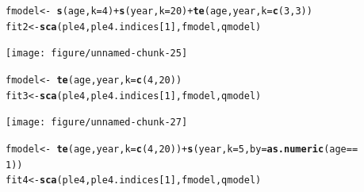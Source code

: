 \documentclass[a4paper,english,10pt]{article}\usepackage[]{graphicx}\usepackage[]{color}
\makeatletter
\newcommand{\hlnum}[1]{\textcolor[rgb]{0.686,0.059,0.569}{#1}}%
\newcommand{\hlopt}[1]{\textcolor[rgb]{0,0,0}{#1}}%
\newcommand{\hlstd}[1]{\textcolor[rgb]{0.345,0.345,0.345}{#1}}%
\newcommand{\hlkwb}[1]{\textcolor[rgb]{0.69,0.353,0.396}{#1}}%
\newcommand{\hlkwc}[1]{\textcolor[rgb]{0.333,0.667,0.333}{#1}}%
\newcommand{\hlkwd}[1]{\textcolor[rgb]{0.737,0.353,0.396}{\textbf{#1}}}%
\newenvironment{kframe}{%
 \def\at@end@of@kframe{}%
 \ifinner\ifhmode%
  \def\at@end@of@kframe{\end{minipage}}%
  \begin{minipage}{\columnwidth}%
 \fi\fi%
 \def\FrameCommand##1{\hskip\@totalleftmargin \hskip-\fboxsep
 \colorbox{shadecolor}{##1}\hskip-\fboxsep
     \hskip-\linewidth \hskip-\@totalleftmargin \hskip\columnwidth}%
 \MakeFramed {\advance\hsize-\width
   \@totalleftmargin\z@ \linewidth\hsize
   \@setminipage}}%
 {\par\unskip\endMakeFramed%
 \at@end@of@kframe}
\newenvironment{knitrout}{}{} %
\makeatother
\begin{document}
\begin{knitrout}
\color{fgcolor}\begin{kframe}
\begin{alltt}
\hlstd{fmodel} \hlkwb{<-} \hlopt{~}\hlkwd{s}\hlstd{(age,} \hlkwc{k} \hlstd{=} \hlnum{4}\hlstd{)} \hlopt{+} \hlkwd{s}\hlstd{(year,} \hlkwc{k} \hlstd{=} \hlnum{20}\hlstd{)} \hlopt{+} \hlkwd{te}\hlstd{(age, year,} \hlkwc{k} \hlstd{=} \hlkwd{c}\hlstd{(}\hlnum{3}\hlstd{,} \hlnum{3}\hlstd{))}
\hlstd{fit2} \hlkwb{<-} \hlkwd{sca}\hlstd{(ple4, ple4.indices[}\hlnum{1}\hlstd{], fmodel, qmodel)}
\end{alltt}
\end{kframe}
\end{knitrout}


\begin{knitrout}
\color{fgcolor}

{\centering \texttt{[image: figure/unnamed-chunk-25]} 

}



\end{knitrout}


\begin{knitrout}
\color{fgcolor}\begin{kframe}
\begin{alltt}
\hlstd{fmodel} \hlkwb{<-} \hlopt{~}\hlkwd{te}\hlstd{(age, year,} \hlkwc{k} \hlstd{=} \hlkwd{c}\hlstd{(}\hlnum{4}\hlstd{,} \hlnum{20}\hlstd{))}
\hlstd{fit3} \hlkwb{<-} \hlkwd{sca}\hlstd{(ple4, ple4.indices[}\hlnum{1}\hlstd{], fmodel, qmodel)}
\end{alltt}
\end{kframe}
\end{knitrout}


\begin{knitrout}
\color{fgcolor}

{\centering \texttt{[image: figure/unnamed-chunk-27]} 

}



\end{knitrout}


\begin{knitrout}
\color{fgcolor}\begin{kframe}
\begin{alltt}
\hlstd{fmodel} \hlkwb{<-} \hlopt{~}\hlkwd{te}\hlstd{(age, year,} \hlkwc{k} \hlstd{=} \hlkwd{c}\hlstd{(}\hlnum{4}\hlstd{,} \hlnum{20}\hlstd{))} \hlopt{+} \hlkwd{s}\hlstd{(year,} \hlkwc{k} \hlstd{=} \hlnum{5}\hlstd{,} \hlkwc{by} \hlstd{=} \hlkwd{as.numeric}\hlstd{(age} \hlopt{==}
    \hlnum{1}\hlstd{))}
\hlstd{fit4} \hlkwb{<-} \hlkwd{sca}\hlstd{(ple4, ple4.indices[}\hlnum{1}\hlstd{], fmodel, qmodel)}
\end{alltt}
\end{kframe}
\end{knitrout}
\end{document}
